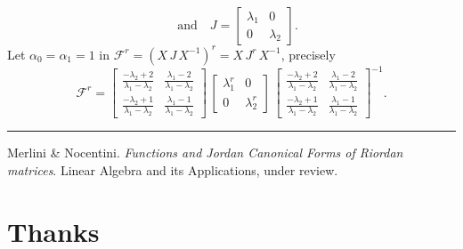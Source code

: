 \documentclass[9pt]{beamer}
\begin{document}
\begin{frame}[fragile]
\begin{displaymath}
\quad\text{and}\quad J = \left[\begin{matrix}\lambda_{1} & 0\\0 & \lambda_{2}\end{matrix}\right].
\end{displaymath}
Let $\alpha_{0} = \alpha_{1} = 1$ in
$\displaystyle \mathcal{F}^{r} = \left(X\,J\,X^{-1}\right)^{r} = X\,J^{r}\,X^{-1}$, precisely
$$\mathcal{F}^{r}=\left[\begin{matrix}\frac{- \lambda_{2} + 2}{\lambda_{1} - \lambda_{2}} & \frac{\lambda_{1} - 2}{\lambda_{1} - \lambda_{2}}\\\frac{- \lambda_{2} + 1}{\lambda_{1} - \lambda_{2}} & \frac{\lambda_{1} - 1}{\lambda_{1} - \lambda_{2}}\end{matrix}\right]\,\left[\begin{matrix}\lambda_{1}^{r} & 0\\0 & \lambda_{2}^{r}\end{matrix}\right]\,\left[\begin{matrix}\frac{- \lambda_{2} + 2}{\lambda_{1} - \lambda_{2}} & \frac{\lambda_{1} - 2}{\lambda_{1} - \lambda_{2}}\\\frac{- \lambda_{2} + 1}{\lambda_{1} - \lambda_{2}} & \frac{\lambda_{1} - 1}{\lambda_{1} - \lambda_{2}}\end{matrix}\right]^{-1}.$$
\vfill
\noindent\rule{\textwidth}{0.1pt}
{\footnotesize
Merlini \& Nocentini. \textit{Functions and Jordan Canonical Forms of Riordan
matrices}. \newline Linear Algebra and its Applications, under review.}
\end{frame}

\section{Thanks}

\end{document}
